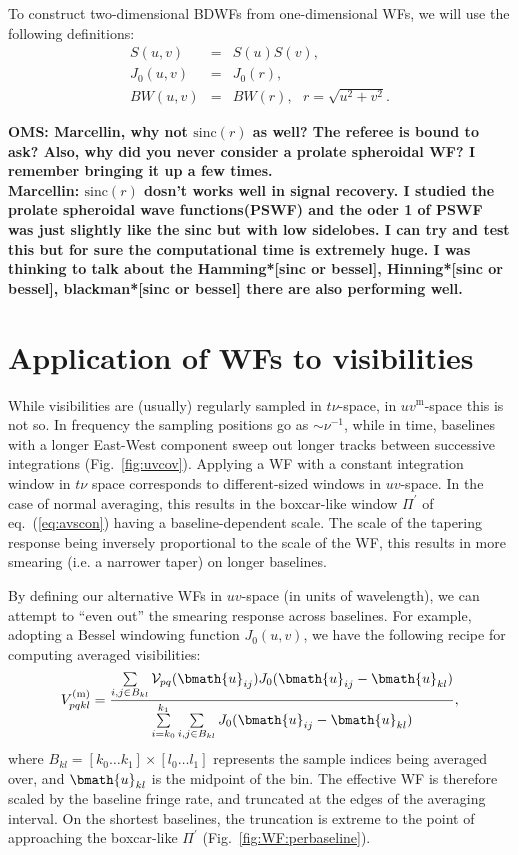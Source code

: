 \documentclass[useAMS,usenatbib]{mn2e}
\begin{document}
To construct two-dimensional BDWFs from one-dimensional WFs, we will use the following definitions:
\begin{eqnarray}
S(u,v) &=& S(u)S(v), \nonumber\\
J_0(u,v) &=& J_0(r), \nonumber\\
BW(u,v) &=& BW(r),~~~r=\sqrt{u^2+v^2}.
\end{eqnarray}

{\bf OMS: Marcellin, why not $\mathrm{sinc}(r)$ as well? The referee is bound to ask? Also, why did you never consider a 
prolate spheroidal WF? I remember bringing it up a few times.}\\
{\bf Marcellin: $\mathrm{sinc}(r)$ dosn't works well in signal recovery. I studied the prolate spheroidal wave functions(PSWF)
and the oder 1 of PSWF was just slightly like the sinc but with low sidelobes. I can try and test this but for sure 
the computational time is extremely huge. I was thinking to talk about 
the Hamming*[sinc or bessel], Hinning*[sinc or bessel], blackman*[sinc or bessel] there are also performing well.}


\section{Application of WFs to visibilities}

While visibilities are (usually) regularly sampled in $t\nu$-space, in $uv^\mathrm{m}$-space this is not so. In frequency the sampling
positions go as $\sim\nu^{-1}$, while in time, baselines with a longer East-West component sweep out longer tracks between successive 
integrations (Fig.~\ref{fig:uvcov}). Applying a WF with a constant integration window in $t\nu$ space corresponds to 
different-sized windows in $uv$-space. In the case of normal averaging, this results in the boxcar-like window $\Pi^\prime$ of 
eq.~(\ref{eq:avscon}) having a baseline-dependent scale. The scale of the tapering response being inversely proportional to 
the scale of the WF, this results in more smearing (i.e. a narrower taper) on longer baselines.

By defining our alternative WFs in $uv$-space (in units of wavelength), we can attempt to ``even out'' the smearing 
response across baselines. For example, adopting a Bessel windowing function $J_0(u,v)$, we have the following recipe 
for computing averaged visibilities:
\begin{equation}
\label{eq:avg:bessel}
V^\mathrm{(m)}_{pqkl} = \frac{\sum\limits_{{i,j}\in B_{kl}} \VV_{pq}(\bmath{u}_{ij}) J_0(\bmath{u}_{ij}-\bmath{u}_{kl})}
{\sum\limits_{i=k_0}^{k_1} \sum\limits_{{i,j}\in B_{kl}} J_0(\bmath{u}_{ij}-\bmath{u}_{kl})},
\end{equation}
where $B_{kl}=[k_0\dots k_1]\times[l_0\dots l_1] $ represents the sample indices being averaged over, and
$\bmath{u}_{kl}$ is the midpoint of the bin. The effective WF is therefore scaled by the baseline fringe rate, and 
truncated at the edges of the averaging interval. On the shortest baselines, the truncation is extreme to the point of 
approaching the boxcar-like $\Pi^\prime$ (Fig.~\ref{fig:WF:perbaseline}).
\end{document}
